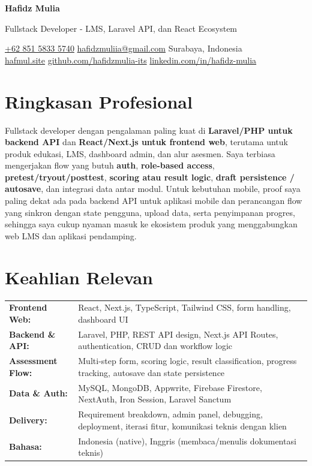 \documentclass[a4paper,11pt]{article}
\newcommand{\cvname}[1]{%
  {\centering\LARGE\bfseries #1\par\vspace{2pt}}%
}
\newcommand{\cvtitle}[1]{%
  {\centering\large\color{accent} #1\par\vspace{4pt}}%
}
\newcommand{\cvcontact}[1]{%
  {\centering\small #1\par\vspace{6pt}}%
}
\begin{document}
\cvname{Hafidz Mulia}
\cvtitle{Fullstack Developer - LMS, Laravel API, dan React Ecosystem}
\cvcontact{%
  \href{tel:+6285158335740}{+62 851 5833 5740} \quad\textbar\quad
  \href{mailto:hafidzmuliia@gmail.com}{hafidzmuliia@gmail.com} \quad\textbar\quad
  Surabaya, Indonesia \\
  \href{https://hafmul.site}{hafmul.site} \quad\textbar\quad
  \href{https://github.com/hafidzmulia-its}{github.com/hafidzmulia-its} \quad\textbar\quad
  \href{https://www.linkedin.com/in/hafidz-mulia/}{linkedin.com/in/hafidz-mulia}
}

\section{Ringkasan Profesional}
Fullstack developer dengan pengalaman paling kuat di \textbf{Laravel/PHP untuk backend API} dan \textbf{React/Next.js untuk frontend web}, terutama untuk produk edukasi, LMS, dashboard admin, dan alur asesmen. Saya terbiasa mengerjakan flow yang butuh \textbf{auth}, \textbf{role-based access}, \textbf{pretest/tryout/posttest}, \textbf{scoring atau result logic}, \textbf{draft persistence / autosave}, dan integrasi data antar modul. Untuk kebutuhan mobile, proof saya paling dekat ada pada backend API untuk aplikasi mobile dan perancangan flow yang sinkron dengan state pengguna, upload data, serta penyimpanan progres, sehingga saya cukup nyaman masuk ke ekosistem produk yang menggabungkan web LMS dan aplikasi pendamping.

\section{Keahlian Relevan}
\begin{tabularx}{\textwidth}{@{}l X@{}}
\textbf{Frontend Web:} & React, Next.js, TypeScript, Tailwind CSS, form handling, dashboard UI \\[3pt]
\textbf{Backend \& API:} & Laravel, PHP, REST API design, Next.js API Routes, authentication, CRUD dan workflow logic \\[3pt]
\textbf{Assessment Flow:} & Multi-step form, scoring logic, result classification, progress tracking, autosave dan state persistence \\[3pt]
\textbf{Data \& Auth:} & MySQL, MongoDB, Appwrite, Firebase Firestore, NextAuth, Iron Session, Laravel Sanctum \\[3pt]
\textbf{Delivery:} & Requirement breakdown, admin panel, debugging, deployment, iterasi fitur, komunikasi teknis dengan klien \\[3pt]
\textbf{Bahasa:} & Indonesia (native), Inggris (membaca/menulis dokumentasi teknis) \\
\end{tabularx}
\end{document}
